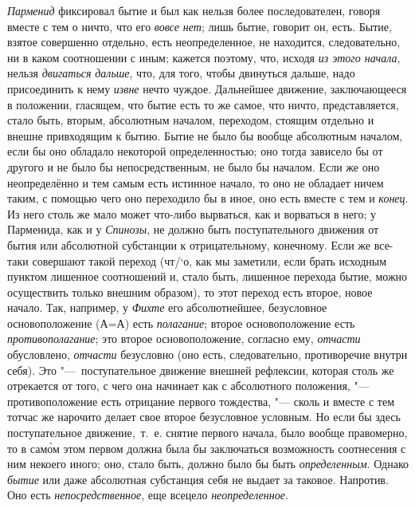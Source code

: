{\em Парменид} фиксировал бытие и был как нельзя более
последователен, говоря вместе с тем о ничто, что его
{\em вовсе нет}; лишь бытие, говорит он, есть. Бытие,
взятое совершенно отдельно, есть неопределенное, не находится,
следовательно, ни в каком соотношении с иным; кажется поэтому, что,
исходя {\em из этого начала}, нельзя
{\em двигаться} {\em дальше}, что,
для того, чтобы двинуться дальше, надо присоединить к нему
{\em извне} нечто чуждое. Дальнейшее движение,
заключающееся в положении, гласящем, что бытие есть то же самое, что ничто,
представляется, стало быть, вторым, абсолютным началом, переходом, стоящим
отдельно и внешне привходящим к бытию. Бытие не было бы вообще абсолютным
началом, если бы оно обладало некоторой определенностью; оно тогда зависело
бы от другого и не было бы непосредственным, не было бы началом. Если же
оно неопределённо и тем самым есть истинное начало, то оно не обладает
ничем таким, с помощью чего оно переходило бы в иное, оно
есть вместе с тем и {\em конец}. Из него столь же мало
может что-либо вырваться, как и ворваться в него; у Парменида, как и у
{\em Спинозы}, не должно быть поступательного движения
от бытия или абсолютной субстанции к отрицательному, конечному. Если же
все-таки совершают такой переход (чт/`{о}, как мы заметили, если брать исходным
пунктом лишенное соотношений и, стало быть, лишенное перехода бытие, можно
осуществить только внешним образом), то этот переход есть второе, новое
начало. Так, например, у {\em Фихте} его абсолютнейшее,
безусловное основоположение (А=А) есть {\em полагание};
второе основоположение есть {\em противополагание}; это
второе основоположение, согласно ему, {\em отчасти}
обусловлено, {\em отчасти} безусловно (оно есть,
следовательно, противоречие внутри себя). Это "---~поступательное движение
внешней рефлексии, которая столь же отрекается от того, с чего она начинает
как с абсолютного положения, "--- противоположение есть отрицание первого
тождества, "--- сколь и вместе с тем тотчас же нарочито делает свое второе
безусловное условным. Но если бы здесь поступательное движение,~т.~е.
снятие первого начала, было вообще правомерно, то в сам\`{о}м этом первом
должна была бы заключаться возможность соотнесения с ним некоего иного;
 оно, стало быть, должно было бы быть
{\em определенным}. Однако
{\em бытие} или даже абсолютная субстанция себя не
выдает за таковое. Напротив. Оно есть
{\em непосредственное}, еще всецело
{\em неопределенное}.

